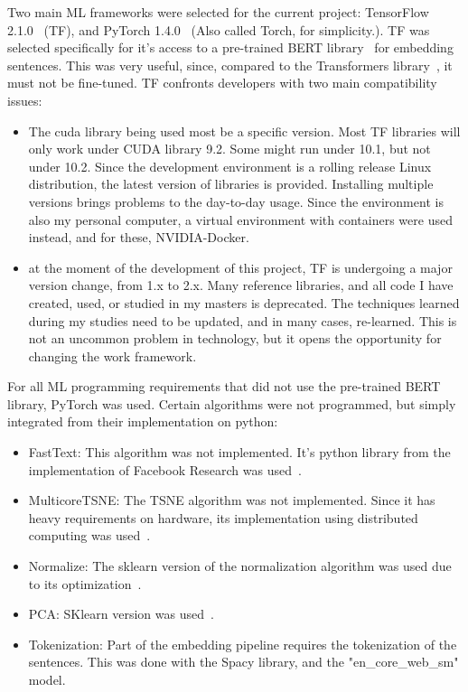 Two main ML frameworks were selected for the current project: TensorFlow 2.1.0~\cite{tensorflow2015whitepaper} (TF), and PyTorch 1.4.0~\cite{pytorch2019} (Also called Torch, for simplicity.). TF was selected specifically for it's access to a pre-trained BERT library~\cite{lai2015bertembedding} for embedding sentences. This was very useful, since, compared to the Transformers library~\cite{wolf2019huggingface}, it must not be fine-tuned. TF confronts developers with two main compatibility issues:

\begin{itemize}
  \item The cuda library being used most be a specific version. Most TF libraries will only work under CUDA library 9.2. Some might run under 10.1, but not under 10.2. Since the development environment is a rolling release Linux distribution, the latest version of libraries is provided. Installing multiple versions brings problems to the day-to-day usage. Since the environment is also my personal computer, a virtual environment with containers were used instead, and for these, NVIDIA-Docker.

  \item at the moment of the development of this project, TF is undergoing a major version change, from 1.x to 2.x. Many reference libraries, and all code I have created, used, or studied in my masters is deprecated. The techniques learned during my studies need to be updated, and in many cases, re-learned.
  This is not an uncommon problem in technology, but it opens the opportunity for changing the work framework.
\end{itemize}

For all ML programming requirements that did not use the pre-trained BERT library, PyTorch was used. Certain algorithms were not programmed, but simply integrated from their implementation on python:

\begin{itemize}
  \item FastText: This algorithm was not implemented. It's python library from the implementation of Facebook Research was used~\cite{joulin2017fasttext}. %

  \item MulticoreTSNE: The TSNE algorithm was not implemented. Since it has heavy requirements on hardware, its implementation using distributed computing was used~\cite{ulyanov2016tsne}.
  \item Normalize: The sklearn version of the normalization algorithm was used due to its optimization~\cite{sklearn}.
  \item PCA: SKlearn version was used~\cite{sklearn}.
  \item Tokenization: Part of the embedding pipeline requires the tokenization of the sentences. This was done with the Spacy library, and the "en_core_web_sm" model.\cite{spacy}
\end{itemize}

